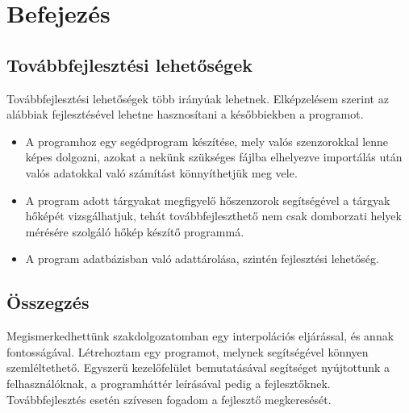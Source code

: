 \chapter{Befejezés}	

	\section*{Továbbfejlesztési lehetőségek}
		Továbbfejlesztési lehetőségek több irányúak lehetnek. Elképzelésem szerint az alábbiak fejlesztésével lehetne hasznosítani a későbbiekben a programot.
		\begin{itemize}
			\item A programhoz egy segédprogram készítése, mely valós szenzorokkal lenne képes dolgozni, azokat a nekünk szükséges fájlba elhelyezve importálás után valós adatokkal való számítást könnyíthetjük meg vele.
			\item A program adott tárgyakat megfigyelő hőszenzorok segítségével a tárgyak hőképét vizsgálhatjuk, tehát továbbfejleszthető nem csak domborzati helyek mérésére szolgáló hőkép készítő programmá.
			\item A program adatbázisban való adattárolása, szintén fejlesztési lehetőség.
		\end{itemize}
	
	\section*{Összegzés}
		Megismerkedhettünk szakdolgozatomban egy interpolációs eljárással, és annak fontosságával. Létrehoztam egy programot, melynek segítségével könnyen szemléltethető. Egyszerű kezelőfelület bemutatásával segítséget nyújtottunk a felhasználóknak, a programháttér leírásával pedig a fejlesztőknek. Továbbfejlesztés esetén szívesen fogadom a fejlesztő megkeresését.
		
		